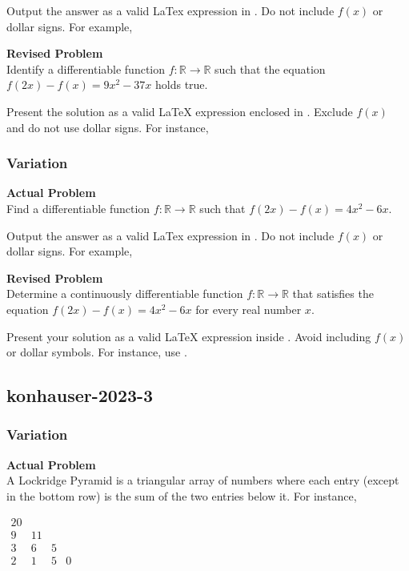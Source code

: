 Output the answer as a valid LaTex expression in . Do not include $f(x)$ or dollar signs. For example, 

\textbf{Revised Problem}\\
Identify a differentiable function $f: \mathbb{R} \rightarrow \mathbb{R}$ such that the equation $f(2x) - f(x) = 9x^2 - 37x$ holds true.

Present the solution as a valid LaTeX expression enclosed in . Exclude $f(x)$ and do not use dollar signs. For instance, 

\subsubsection{Variation}
\textbf{Actual Problem}\\
Find a differentiable function $f \colon \mathbb{R} \to \mathbb{R}$ such that $f(2x) - f(x) = 4x^2 - 6x$.

Output the answer as a valid LaTex expression in . Do not include $f(x)$ or dollar signs. For example, 

\textbf{Revised Problem}\\
Determine a continuously differentiable function $f: \mathbb{R} \to \mathbb{R}$ that satisfies the equation $f(2x) - f(x) = 4x^2 - 6x$ for every real number $x$.

Present your solution as a valid LaTeX expression inside . Avoid including $f(x)$ or dollar symbols. For instance, use .

\subsection{konhauser-2023-3}
\subsubsection{Variation}
\textbf{Actual Problem}\\
A Lockridge Pyramid is a triangular array of numbers where each entry (except in the bottom row) is the sum of the two entries below it. For instance,

$\begin{array}{cccc}
    20 \\
    9 & 11 \\
    3 &  6 & 5 \\
    2 &  1 & 5 & 0 \\
\end{array}$

